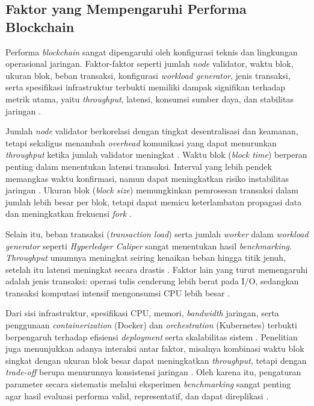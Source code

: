 \subsection{Faktor yang Mempengaruhi Performa Blockchain}

Performa \textit{blockchain} sangat dipengaruhi oleh konfigurasi teknis dan lingkungan operasional jaringan. Faktor-faktor seperti jumlah \textit{node} validator, waktu blok, ukuran blok, beban transaksi, konfigurasi \textit{workload generator}, jenis transaksi, serta spesifikasi infrastruktur terbukti memiliki dampak signifikan terhadap metrik utama, yaitu \textit{throughput}, latensi, konsumsi sumber daya, dan stabilitas jaringan \cite{kaur2021, hao2018, shahsavari2022, xu2021, gobel2017}.

Jumlah \textit{node} validator berkorelasi dengan tingkat desentralisasi dan keamanan, tetapi sekaligus menambah \textit{overhead} komunikasi yang dapat menurunkan \textit{throughput} ketika jumlah validator meningkat \cite{kaur2021, hao2018}. Waktu blok (\textit{block time}) berperan penting dalam menentukan latensi transaksi. Interval yang lebih pendek memangkas waktu konfirmasi, namun dapat meningkatkan risiko instabilitas jaringan \cite{shahsavari2022, xu2021}. Ukuran blok (\textit{block size}) memungkinkan pemrosesan transaksi dalam jumlah lebih besar per blok, tetapi dapat memicu keterlambatan propagasi data dan meningkatkan frekuensi \textit{fork} \cite{shahsavari2022, gobel2017}.

Selain itu, beban transaksi (\textit{transaction load}) serta jumlah \textit{worker} dalam \textit{workload generator} seperti \textit{Hyperledger Caliper} sangat menentukan hasil \textit{benchmarking}. \textit{Throughput} umumnya meningkat seiring kenaikan beban hingga titik jenuh, setelah itu latensi meningkat secara drastis \cite{thakkar2018, ucbas2023}. Faktor lain yang turut memengaruhi adalah jenis transaksi: operasi tulis cenderung lebih berat pada I/O, sedangkan transaksi komputasi intensif mengonsumsi CPU lebih besar \cite{dinh2017, gaba2022}.

Dari sisi infrastruktur, spesifikasi CPU, memori, \textit{bandwidth} jaringan, serta penggunaan \textit{containerization} (Docker) dan \textit{orchestration} (Kubernetes) terbukti berpengaruh terhadap efisiensi \textit{deployment} serta skalabilitas sistem \cite{zheng2019, wu2022}. Penelitian juga menunjukkan adanya interaksi antar faktor, misalnya kombinasi waktu blok singkat dengan ukuran blok besar dapat meningkatkan \textit{throughput}, tetapi dengan \textit{trade-off} berupa menurunnya konsistensi jaringan \cite{shahsavari2022, gobel2017}. Oleh karena itu, pengaturan parameter secara sistematis melalui eksperimen \textit{benchmarking} sangat penting agar hasil evaluasi performa valid, representatif, dan dapat direplikasi \cite{kaur2021, thakkar2018, fan2020}.

